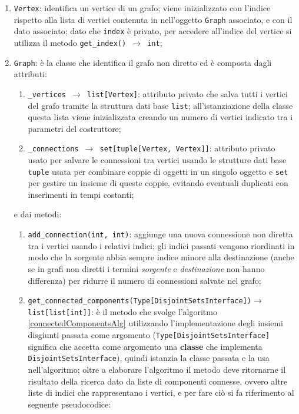 \begin{enumerate}
      \item \texttt{Vertex}: identifica un vertice di un grafo; viene inizializzato con l'indice rispetto
            alla lista di vertici contenuta in nell'oggetto \texttt{Graph} associato, e con il dato associato;
            dato che \texttt{index} è privato, per accedere all'indice del vertice si utilizza il metodo
            \texttt{get\_index() $\rightarrow$ int};\newpage
      \item \texttt{Graph}: è la classe che identifica il grafo non diretto ed è composta dagli attributi:
            \begin{enumerate}
                  \item \texttt{\_vertices $\rightarrow$ list[Vertex]}: attributo privato che salva tutti i
                        vertici del grafo tramite la struttura dati base \texttt{list}; all'istanziazione
                        della classe questa lista viene inizializzata creando un numero di vertici indicato
                        tra i parametri del costruttore;
                  \item \texttt{\_connections $\rightarrow$ set[tuple[Vertex, Vertex]]}: attributo privato usato
                        per salvare le connessioni tra vertici usando le strutture dati base \texttt{tuple} usata
                        per combinare coppie di oggetti in un singolo oggetto e \texttt{set} per gestire un insieme
                        di queste coppie, evitando eventuali duplicati con inserimenti in tempi costanti;
            \end{enumerate}
            e dai metodi:
            \begin{enumerate}[resume]
                  \item \texttt{add\_connection(int, int)}: aggiunge una nuova connessione non diretta tra i vertici
                        usando i relativi indici; gli indici passati vengono riordinati in modo che la sorgente abbia
                        sempre indice minore alla destinazione (anche se in grafi non diretti i termini \textit{sorgente}
                        e \textit{destinazione} non hanno differenza) per ridurre il numero di connessioni salvate nel grafo;
                  \item \texttt{get\_connected\_components(Type[DisjointSetsInterface])\linebreak $\rightarrow$ list[list[int]]}:
                        è il metodo che svolge l'algoritmo \ref{connectedComponentsAlg} utilizzando l'implementazione degli
                        insiemi disgiunti passata come argomento (\texttt{Type[DisjointSetsInterface]} significa che accetta come
                        argomento una \textbf{classe} che implementa \texttt{DisjointSetsInterface}), quindi istanzia la classe
                        passata e la usa nell'algoritmo; oltre a elaborare l'algoritmo il metodo deve ritornarne il risultato
                        della ricerca dato da liste di componenti connesse, ovvero altre liste di indici che rappresentano i vertici,
                        e per fare ciò si fa riferimento al seguente pseudocodice:


\end{enumerate}
\end{enumerate}
